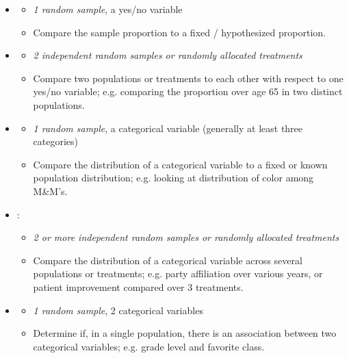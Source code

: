 \begin{itemize}\vspace{-2mm}
\setlength{\itemsep}{0mm}
\item {}
\begin{itemize}\vspace{-1mm}
\setlength{\itemsep}{0mm}
\item \emph{1 random sample}, a yes/no variable
\item Compare the sample proportion to a fixed / hypothesized proportion.
\end{itemize}

\item {}
\begin{itemize}\vspace{-2mm}
\setlength{\itemsep}{0mm}
\item \emph{2 independent random samples or randomly allocated treatments}
\item Compare two populations or treatments to each other with respect to one yes/no variable; e.g. comparing the proportion over age 65 in two distinct populations.
\end{itemize}

\item {}
\begin{itemize}\vspace{-2mm}
\setlength{\itemsep}{0mm}
\item \emph{1 random sample}, a categorical variable (generally at least three categories)
\item Compare the distribution of a categorical variable to a fixed or known population distribution; e.g. looking at distribution of color among M\&M's. 
\end{itemize}

\item {}: 
\begin{itemize}\vspace{-2mm}
\setlength{\itemsep}{0mm}
\item \emph{2 or more independent random samples or randomly allocated treatments} 
\item Compare the distribution of a categorical variable across several populations or treatments; e.g. party affiliation over various years, or patient improvement compared over 3 treatments.
\end{itemize}

\item {}
\begin{itemize}\vspace{-2mm}
\setlength{\itemsep}{0mm}
\item \emph{1 random sample}, 2 categorical variables
\item Determine if, in a single population, there is an association between two categorical variables; e.g. grade level and favorite class.
\end{itemize}

\end{itemize}

